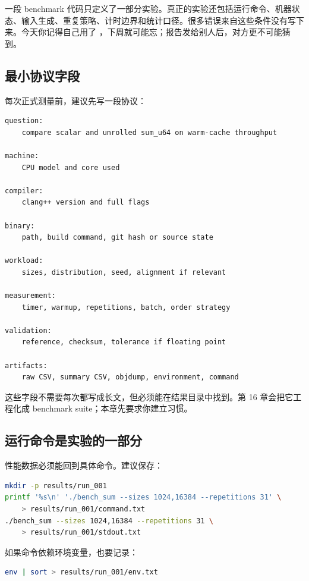 一段 benchmark 代码只定义了一部分实验。真正的实验还包括运行命令、机器状态、输入生成、重复策略、计时边界和统计口径。很多错误来自这些条件没有写下来。今天你记得自己用了 ，下周就可能忘；报告发给别人后，对方更不可能猜到。

\subsection{最小协议字段}

每次正式测量前，建议先写一段协议：

\begin{lstlisting}
question:
    compare scalar and unrolled sum_u64 on warm-cache throughput

machine:
    CPU model and core used

compiler:
    clang++ version and full flags

binary:
    path, build command, git hash or source state

workload:
    sizes, distribution, seed, alignment if relevant

measurement:
    timer, warmup, repetitions, batch, order strategy

validation:
    reference, checksum, tolerance if floating point

artifacts:
    raw CSV, summary CSV, objdump, environment, command
\end{lstlisting}

这些字段不需要每次都写成长文，但必须能在结果目录中找到。第 16 章会把它工程化成 benchmark suite；本章先要求你建立习惯。

\subsection{运行命令是实验的一部分}

性能数据必须能回到具体命令。建议保存：

\begin{lstlisting}[language=bash]
mkdir -p results/run_001
printf '%s\n' './bench_sum --sizes 1024,16384 --repetitions 31' \
    > results/run_001/command.txt
./bench_sum --sizes 1024,16384 --repetitions 31 \
    > results/run_001/stdout.txt
\end{lstlisting}

如果命令依赖环境变量，也要记录：

\begin{lstlisting}[language=bash]
env | sort > results/run_001/env.txt
\end{lstlisting}

